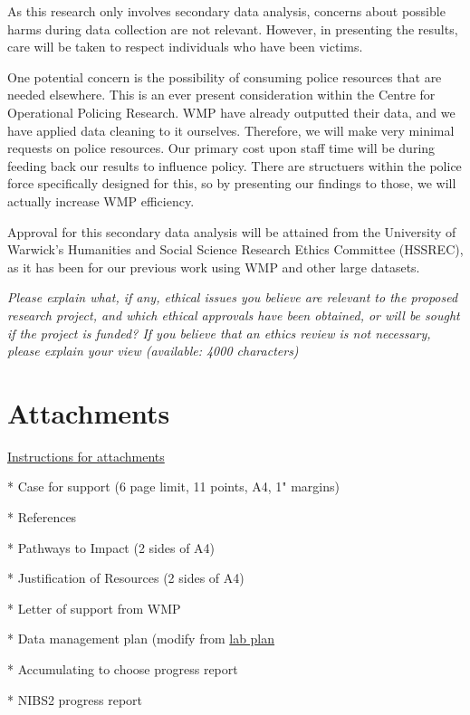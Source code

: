\documentclass[11pt, a4paper]{article}
\begin{document}
As this research only involves secondary data analysis, concerns about possible harms during data collection are not relevant. However, in presenting the results, care will be taken to respect individuals who have been victims.

One potential concern is the possibility of consuming police resources that are needed elsewhere. This is an ever present consideration within the Centre for Operational Policing Research. WMP have already outputted their data, and we have applied data cleaning to it ourselves. Therefore, we will make very minimal requests on police resources. Our primary cost upon staff time will be during feeding back our results to influence policy. There are structuers within the police force specifically designed for this, so by presenting our findings to those, we will actually increase WMP efficiency.

Approval for this secondary data analysis will be attained from the University of Warwick's Humanities and Social Science Research Ethics Committee (HSSREC), as it has been for our previous work using WMP and other large datasets.

\textit{Please explain what, if any, ethical issues you believe are relevant to the proposed research project, and which ethical approvals have been obtained, or will be sought if the project is funded? If you believe that an ethics review is not necessary, please explain your view (available: 4000 characters)}


\section{Attachments}

\href{https://je-s.rcuk.ac.uk/Handbook/Index.htm#pages/GuidanceonCompletingaStandardG/CaseforSupportandAttachments/ESRCSpecificRequirements.htm}{Instructions for attachments}

* Case for support (6 page limit, 11 points, A4, 1" margins) 

* References

* Pathways to Impact (2 sides of A4) 

* Justification of Resources (2 sides of A4)

* Letter of support from WMP

* Data management plan (modify from \href{https://github.com/neil-stewart/data_management_plan}{lab plan}


* Accumulating to choose progress report

* NIBS2 progress report



\newpage



\end{document}
